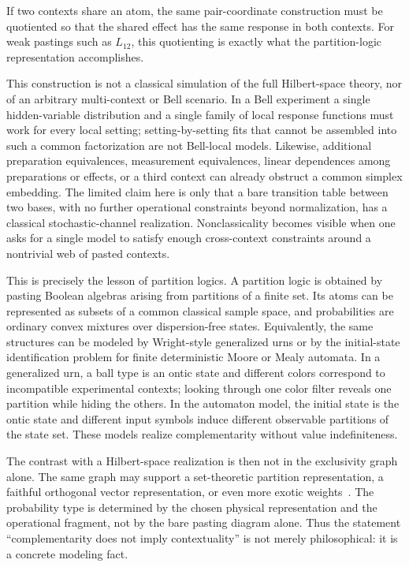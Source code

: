 \documentclass[aps,pra,twocolumn,superscriptaddress,nofootinbib]{revtex4-2}
\begin{document}
If two contexts share an atom, the same pair-coordinate construction must be
quotiented so that the shared effect has the same response in both contexts.
For weak pastings such as \(L_{12}\), this quotienting is exactly what the
partition-logic representation accomplishes.

This construction is not a classical simulation of the full Hilbert-space
theory, nor of an arbitrary multi-context or Bell scenario.  In a Bell
experiment a single hidden-variable distribution and a single family of local
response functions must work for every local setting; setting-by-setting fits
that cannot be assembled into such a common factorization are not Bell-local
models.  Likewise, additional preparation equivalences, measurement
equivalences, linear dependences among preparations or effects, or a third
context can already obstruct a common simplex embedding.  The limited claim
here is only that a bare transition table between two bases, with no further
operational constraints beyond normalization, has a classical stochastic-channel
realization.  Nonclassicality becomes visible when one asks for a single model
to satisfy enough cross-context constraints around a nontrivial web of pasted
contexts.

This is precisely the lesson of partition logics.  A partition logic is obtained by pasting Boolean algebras arising from partitions of a finite set.  Its atoms can be represented as subsets of a common classical sample space, and probabilities are ordinary convex mixtures over dispersion-free states.  Equivalently, the same structures can be modeled by Wright-style generalized urns or by the initial-state identification problem for finite deterministic Moore or Mealy automata.  In a generalized urn, a ball type is an ontic state and different colors correspond to incompatible experimental contexts; looking through one color filter reveals one partition while hiding the others.  In the automaton model, the initial state is the ontic state and different input symbols induce different observable partitions of the state set.  These models realize complementarity without value indefiniteness.

The contrast with a Hilbert-space realization is then not in the exclusivity graph alone.  The same graph may support a set-theoretic partition representation, a faithful orthogonal vector representation, or even more exotic weights~\cite{svozil-2018-b}.  The probability type is determined by the chosen physical representation and the operational fragment, not by the bare pasting diagram alone.  Thus the statement ``complementarity does not imply contextuality'' is not merely philosophical: it is a concrete modeling fact.
\end{document}
